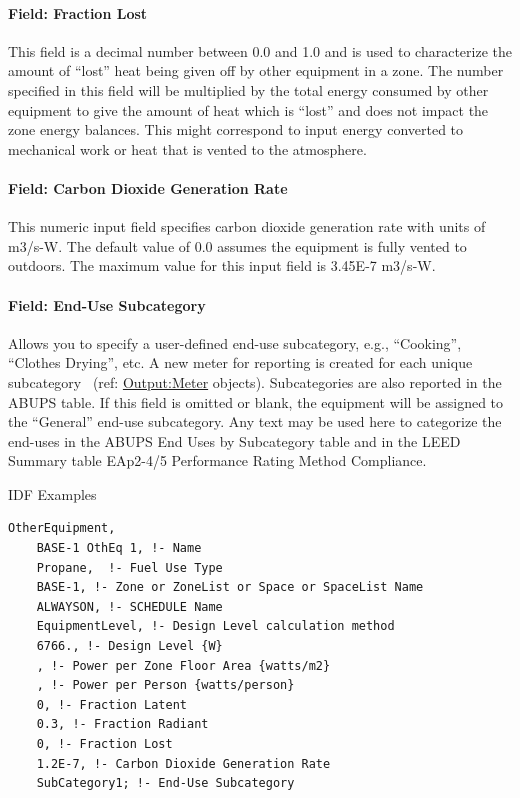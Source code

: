 \paragraph{Field: Fraction Lost}\label{field-fraction-lost-4}

This field is a decimal number between 0.0 and 1.0 and is used to characterize the amount of ``lost'' heat being given off by other equipment in a zone. The number specified in this field will be multiplied by the total energy consumed by other equipment to give the amount of heat which is ``lost'' and does not impact the zone energy balances. This might correspond to input energy converted to mechanical work or heat that is vented to the atmosphere.

\paragraph{Field: Carbon Dioxide Generation Rate}\label{field-carbon-dioxide-generation-rate-otherequip}

This numeric input field specifies carbon dioxide generation rate with units of m3/s-W. The default value of 0.0 assumes the equipment is fully vented to outdoors. The maximum value for this input field is 3.45E-7 m3/s-W.

\paragraph{Field: End-Use Subcategory}\label{field-end-use-subcategory-otherequip}

Allows you to specify a user-defined end-use subcategory, e.g., ``Cooking'', ``Clothes Drying'', etc. A new meter for reporting is created for each unique subcategory~ (ref: \hyperref[outputmeter-and-outputmetermeterfileonly]{Output:Meter} objects). Subcategories are also reported in the ABUPS table. If this field is omitted or blank, the equipment will be assigned to the ``General'' end-use subcategory. Any text may be used here to categorize the end-uses in the ABUPS End Uses by Subcategory table and in the LEED Summary table EAp2-4/5 Performance Rating Method Compliance.


IDF Examples

\begin{lstlisting}
OtherEquipment,
	BASE-1 OthEq 1, !- Name
	Propane,  !- Fuel Use Type
	BASE-1, !- Zone or ZoneList or Space or SpaceList Name
	ALWAYSON, !- SCHEDULE Name
	EquipmentLevel, !- Design Level calculation method
	6766., !- Design Level {W}
	, !- Power per Zone Floor Area {watts/m2}
	, !- Power per Person {watts/person}
	0, !- Fraction Latent
	0.3, !- Fraction Radiant
	0, !- Fraction Lost
	1.2E-7, !- Carbon Dioxide Generation Rate
	SubCategory1; !- End-Use Subcategory
\end{lstlisting}

